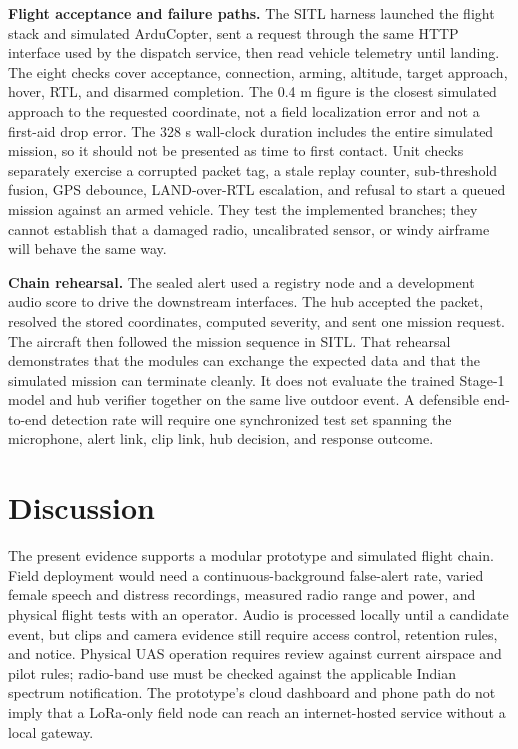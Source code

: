 \documentclass[conference]{IEEEtran}
\begin{document}
\textbf{Flight acceptance and failure paths.} The SITL harness launched the flight stack and simulated ArduCopter, sent a request through the same HTTP interface used by the dispatch service, then read vehicle telemetry until landing. The eight checks cover acceptance, connection, arming, altitude, target approach, hover, RTL, and disarmed completion. The 0.4 m figure is the closest simulated approach to the requested coordinate, not a field localization error and not a first-aid drop error. The 328 s wall-clock duration includes the entire simulated mission, so it should not be presented as time to first contact. Unit checks separately exercise a corrupted packet tag, a stale replay counter, sub-threshold fusion, GPS debounce, LAND-over-RTL escalation, and refusal to start a queued mission against an armed vehicle. They test the implemented branches; they cannot establish that a damaged radio, uncalibrated sensor, or windy airframe will behave the same way.

\textbf{Chain rehearsal.} The sealed alert used a registry node and a development audio score to drive the downstream interfaces. The hub accepted the packet, resolved the stored coordinates, computed severity, and sent one mission request. The aircraft then followed the mission sequence in SITL. That rehearsal demonstrates that the modules can exchange the expected data and that the simulated mission can terminate cleanly. It does not evaluate the trained Stage-1 model and hub verifier together on the same live outdoor event. A defensible end-to-end detection rate will require one synchronized test set spanning the microphone, alert link, clip link, hub decision, and response outcome.




\section{Discussion}
\label{sec:discussion}
The present evidence supports a modular prototype and simulated flight chain. Field deployment would need a continuous-background false-alert rate, varied female speech and distress recordings, measured radio range and power, and physical flight tests with an operator. Audio is processed locally until a candidate event, but clips and camera evidence still require access control, retention rules, and notice. Physical UAS operation requires review against current airspace and pilot rules; radio-band use must be checked against the applicable Indian spectrum notification. The prototype's cloud dashboard and phone path do not imply that a LoRa-only field node can reach an internet-hosted service without a local gateway.
\end{document}
